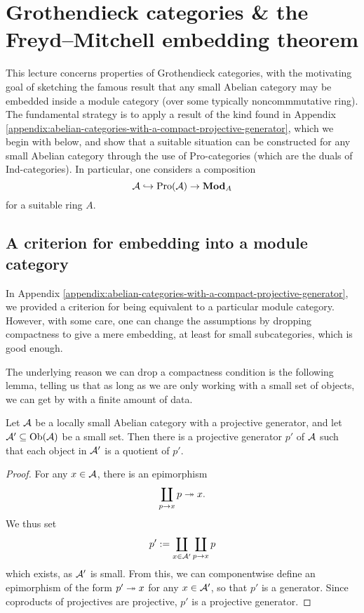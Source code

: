 
\section{Grothendieck categories \& the Freyd--Mitchell embedding theorem}
This lecture concerns properties of Grothendieck categories, with the motivating goal of sketching the famous result that any small Abelian category may be embedded inside a module category (over some typically noncommmutative ring).
The fundamental strategy is to apply a result of the kind found in Appendix \ref{appendix:abelian-categories-with-a-compact-projective-generator}, which we begin with below, and show
that a suitable situation can be constructed for any small Abelian category through the use of Pro-categories (which are the duals of Ind-categories). In particular, one considers a composition
\[ \mathcal{A}\hookrightarrow\operatorname{Pro}(\mathcal{A}) \to \mathbf{Mod}_A \]
for a suitable ring \(A\).

\subsection{A criterion for embedding into a module category}
In Appendix \ref{appendix:abelian-categories-with-a-compact-projective-generator}, we provided a criterion for being equivalent to a particular module category.
However, with some care, one can change the assumptions by dropping compactness to give a mere embedding, at least for small subcategories, which is good enough.

The underlying reason we can drop a compactness condition is the following lemma, telling us that as long as we are only working with a small set of objects,
we can get by with a finite amount of data.
\begin{lemma}\label{lemma:small-set-quotients-of-projective-generator}
	Let \(\mathcal{A}\) be a locally small Abelian category with a projective generator, and let \(\mathcal{A}'\subseteq\operatorname{Ob}(\mathcal{A})\) be a small set.
	Then there is a projective generator \(p'\) of \(\mathcal{A}\) such that each object in \(\mathcal{A}'\) is a quotient of \(p'\).
\end{lemma}
\begin{proof}
For any \(x\in\mathcal{A}\), there is an epimorphism
\[ \coprod_{p\to x}p\twoheadrightarrow x. \]
We thus set
\[ p' := \coprod_{x\in\mathcal{A}'}\coprod_{p\to x}p \]
which exists, as \(\mathcal{A}'\) is small. From this, we can componentwise define an epimorphism of the form \(p'\twoheadrightarrow x\) for any \(x\in\mathcal{A}'\), so that \(p'\) is a generator.
Since coproducts of projectives are projective, \(p'\) is a projective generator.
\end{proof}

